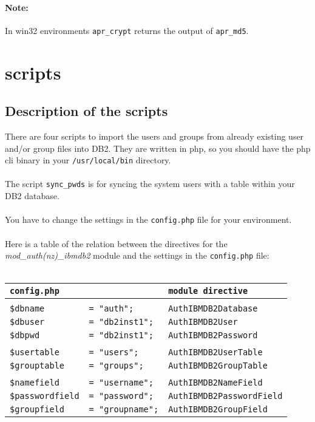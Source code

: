 \documentclass[11pt,a4paper]{article}
\begin{document}
\paragraph{Note:}{In win32 environments {\tt apr\_crypt} returns the output of {\tt apr\_md5}.}
\newpage

\section{scripts}
\subsection{Description of the scripts}
There are four scripts to import the users and groups from already existing user and/or group files into DB2. They are written in php, so you should have the php cli binary in your {\tt /usr/local/bin} directory.\\
\\
The script {\tt sync\_pwds} is for syncing the system users with a table within your DB2 database.\\
\\
You have to change the settings in the {\tt config.php} file for your environment.\\
\\
Here is a table of the relation between the directives for the \emph{mod\_auth(nz)\_ibmdb2} module
and the settings in the {\tt config.php} file:\\
\\
\begin{tabular}{@{} lll @{}}
{\tt config.php} & & {\tt module directive}\\
\hline
& & \\
{\tt \$dbname} & {\tt = "auth";} & {\tt AuthIBMDB2Database} \\
{\tt \$dbuser} & {\tt = "db2inst1";} & {\tt AuthIBMDB2User} \\
{\tt \$dbpwd} & {\tt = "db2inst1";} & {\tt AuthIBMDB2Password} \\
& & \\
{\tt \$usertable} & {\tt = "users";} & {\tt AuthIBMDB2UserTable} \\
{\tt \$grouptable} & {\tt = "groups";} & {\tt AuthIBMDB2GroupTable} \\
& & \\
{\tt \$namefield} & {\tt = "username";} & {\tt AuthIBMDB2NameField} \\	
{\tt \$passwordfield} & {\tt = "password";} & {\tt AuthIBMDB2PasswordField} \\
{\tt \$groupfield} & {\tt = "groupname";} & {\tt AuthIBMDB2GroupField} \\
\end{tabular}
\\
\end{document}
